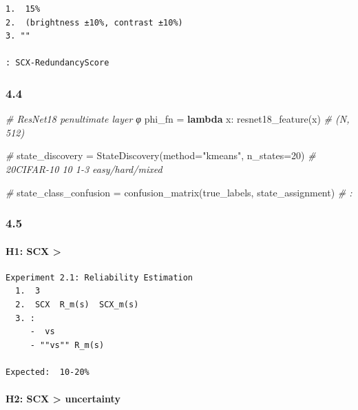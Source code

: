\documentclass[
  12pt,
]{article}
\newenvironment{Shaded}{}{}
\newcommand{\CommentTok}[1]{\textcolor[rgb]{0.38,0.63,0.69}{\textit{#1}}}
\newcommand{\DecValTok}[1]{\textcolor[rgb]{0.25,0.63,0.44}{#1}}
\newcommand{\KeywordTok}[1]{\textcolor[rgb]{0.00,0.44,0.13}{\textbf{#1}}}
\newcommand{\NormalTok}[1]{#1}
\newcommand{\OperatorTok}[1]{\textcolor[rgb]{0.40,0.40,0.40}{#1}}
\newcommand{\StringTok}[1]{\textcolor[rgb]{0.25,0.44,0.63}{#1}}
\begin{document}
\begin{verbatim}
1.  15% 
2.  (brightness ±10%, contrast ±10%)
3. ""

: SCX-RedundancyScore 
\end{verbatim}

\subsubsection{4.4
}\label{ux72b6ux6001ux7a7aux95f4ux6784ux9020}

\begin{Shaded}
\begin{Highlighting}[]
\CommentTok{\#  ResNet18  penultimate layer  φ}
\NormalTok{phi\_fn }\OperatorTok{=} \KeywordTok{lambda}\NormalTok{ x: resnet18\_feature(x)   }\CommentTok{\# (N, 512)}

\CommentTok{\# }
\NormalTok{state\_discovery }\OperatorTok{=}\NormalTok{ StateDiscovery(method}\OperatorTok{=}\StringTok{"kmeans"}\NormalTok{, n\_states}\OperatorTok{=}\DecValTok{20}\NormalTok{)}
\CommentTok{\#  20CIFAR{-}10  10  1{-}3 easy/hard/mixed}

\CommentTok{\# }
\NormalTok{state\_class\_confusion }\OperatorTok{=}\NormalTok{ confusion\_matrix(true\_labels, state\_assignment)}
\CommentTok{\# : }
\end{Highlighting}
\end{Shaded}

\subsubsection{4.5 }\label{ux9a8cux8bc1ux5047ux8bbe}

\paragraph{H1: SCX  \textgreater{}
}\label{h1-scx-ux72b6ux6001ux6761ux4ef6ux53efux9760ux6027-ux5168ux5c40ux53efux9760ux6027}

\begin{verbatim}
Experiment 2.1: Reliability Estimation
  1.  3 
  2.  SCX  R_m(s)  SCX_m(s)
  3. :
     -  vs 
     - ""vs"" R_m(s) 

Expected:  10-20%
\end{verbatim}

\paragraph{H2: SCX  \textgreater{} 
uncertainty}\label{h2-scx-ux72b6ux6001ux4ef7ux503c-ux4f20ux7edf-uncertainty}
\end{document}
